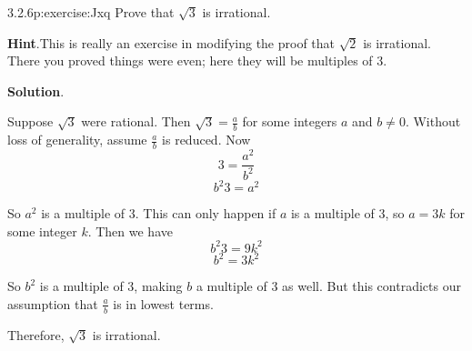 \documentclass[twoside,11pt,]{book}
\newcommand{\blocktitlefont}{\relax}
\numberwithin{equation}{chapter}
\begin{document}
\begin{divisionsolution}{3.2.6}{}{p:exercise:Jxq}%
Prove that \(\sqrt 3\) is irrational.%
\par\smallskip%
\noindent\textbf{\blocktitlefont Hint}.\quad{}This is really an exercise in modifying the proof that \(\sqrt{2}\) is irrational.  There you proved things were even; here they will be multiples of 3.%
\par\smallskip%
\noindent\textbf{\blocktitlefont Solution}.\quad{}\begin{solutionproof}
Suppose \(\sqrt{3}\) were rational. Then \(\sqrt{3} = \frac{a}{b}\) for some integers \(a\) and \(b \ne 0\). Without loss of generality, assume \(\frac{a}{b}\) is reduced. Now%
\begin{equation*}
3 = \frac{a^2}{b^2}
\end{equation*}
%
\begin{equation*}
b^2 3 = a^2
\end{equation*}
%
\par
So \(a^2\) is a multiple of 3. This can only happen if \(a\) is a multiple of 3, so \(a = 3k\) for some integer \(k\). Then we have%
\begin{equation*}
b^2 3 = 9k^2
\end{equation*}
%
\begin{equation*}
b^2 = 3k^2
\end{equation*}
%
\par
So \(b^2\) is a multiple of 3, making \(b\) a multiple of 3 as well. But this contradicts our assumption that \(\frac{a}{b}\) is in lowest terms.%
\par
Therefore, \(\sqrt{3}\) is irrational.%
\end{solutionproof}
\end{divisionsolution}%
\end{document}
